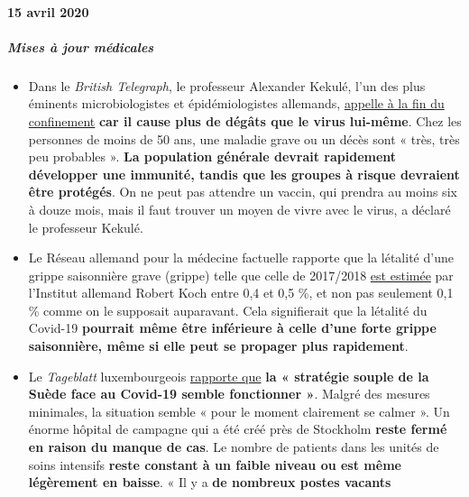 \hypertarget{15-avril-2020}{%
\paragraph{15 avril 2020}\label{15-avril-2020}}

\hypertarget{mises-uxe0-jour-muxe9dicales-1}{%
\subparagraph{\texorpdfstring{\textbf{Mises à jour
médicales}}{Mises à jour médicales}}\label{mises-uxe0-jour-muxe9dicales-1}}

\begin{itemize}
\tightlist
\item
  Dans le \emph{British Telegraph}, le professeur Alexander Kekulé, l'un
  des plus éminents microbiologistes et épidémiologistes allemands,
  \href{https://www.telegraph.co.uk/news/2020/04/11/german-scientist-predicted-european-epidemic-calls-end-lockdown/}{appelle
  à la fin du confinement} \textbf{car il cause plus de dégâts que le
  virus lui-même}. Chez les personnes de moins de 50 ans, une maladie
  grave ou un décès sont « très, très peu probables ». \textbf{La
  population générale devrait rapidement développer une immunité, tandis
  que les groupes à risque devraient être protégés}. On ne peut pas
  attendre un vaccin, qui prendra au moins six à douze mois, mais il
  faut trouver un moyen de vivre avec le virus, a déclaré le professeur
  Kekulé.
\item
  Le Réseau allemand pour la médecine factuelle rapporte que la létalité
  d'une grippe saisonnière grave (grippe) telle que celle de 2017/2018
  \href{https://www.ebm-netzwerk.de/en/publications/covid-19}{est
  estimée} par l'Institut allemand Robert Koch entre 0,4 et 0,5 \%, et
  non pas seulement 0,1 \% comme on le supposait auparavant. Cela
  signifierait que la létalité du Covid-19 \textbf{pourrait même être
  inférieure à celle d'une forte grippe saisonnière, même si elle peut
  se propager plus rapidement}.
\item
  Le \emph{Tageblatt} luxembourgeois
  \href{https://swprs.files.wordpress.com/2020/04/volksblatt_schweden_corona_20200414_18.pdf}{rapporte
  que} \textbf{la « stratégie souple de la Suède face au Covid-19 semble
  fonctionner »}. Malgré des mesures minimales, la situation semble «
  pour le moment clairement se calmer ». Un énorme hôpital de campagne
  qui a été créé près de Stockholm \textbf{reste fermé en raison du
  manque de cas}. Le nombre de patients dans les unités de soins
  intensifs \textbf{reste constant à un faible niveau ou est même
  légèrement en baisse}. « Il y a \textbf{de nombreux postes vacants
}
\end{itemize}
